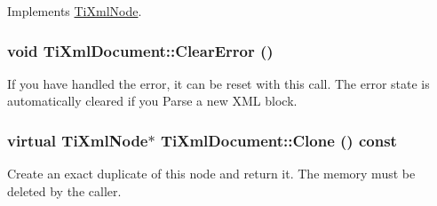 Implements \hyperlink{class_ti_xml_node_acc0f88b7462c6cb73809d410a4f5bb86}{TiXmlNode}.\hypertarget{class_ti_xml_document_ac66b8c28db86363315712a3574e87c35}{
\subsubsection[{ClearError}]{\setlength{\rightskip}{0pt plus 5cm}void TiXmlDocument::ClearError ()}}
\label{class_ti_xml_document_ac66b8c28db86363315712a3574e87c35}
If you have handled the error, it can be reset with this call. The error state is automatically cleared if you Parse a new XML block. \hypertarget{class_ti_xml_document_a4968661cab4a1f44a23329c6f8db1907}{
\subsubsection[{Clone}]{\setlength{\rightskip}{0pt plus 5cm}virtual {\bf TiXmlNode}$\ast$ TiXmlDocument::Clone () const}}
\label{class_ti_xml_document_a4968661cab4a1f44a23329c6f8db1907}
Create an exact duplicate of this node and return it. The memory must be deleted by the caller. 

